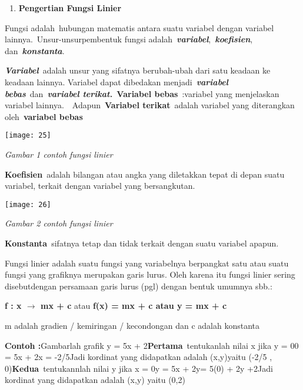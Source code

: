 \documentclass[11pt,fleqn]{book} %
\begin{document}
\begin{myEnumerate}
\begin{itemize}
\begin{enumerate}
\item \textbf{ Pengertian Fungsi Linier}
\end{enumerate}

\noindent \textbf{}

Fungsi adalah~hubungan matematis antara suatu variabel dengan variabel lainnya.~Unsur-unsurpembentuk fungsi adalah~\textbf{\textit{variabel}},~\textbf{\textit{koefisien}}, dan~\textbf{\textit{konstanta}}.

\textbf{\textit{Variabel}}~adalah unsur yang sifatnya berubah-ubah dari satu keadaan ke keadaan lainnya. Variabel dapat dibedakan menjadi~\textbf{\textit{variabel bebas}}~dan~\textbf{\textit{variabel terikat.}}~\textbf{Variabel bebas}~:variabel yang menjelaskan variabel lainnya.~~Adapun~\textbf{Variabel terikat}~adalah variabel yang diterangkan oleh~\textbf{variabel bebas}

\begin{center}
\texttt{[image: 25]}
\end{center}

\textit{Gambar 1 contoh fungsi linier}

\textbf{Koefisien}~adalah bilangan atau angka yang diletakkan tepat di depan suatu variabel, terkait dengan variabel yang bersangkutan.

\begin{center}
\texttt{[image: 26]}
\end{center}

\textit{Gambar 2 contoh fungsi linier}



\textbf{Konstanta}~sifatnya tetap dan tidak terkait dengan suatu variabel apapun.



Fungsi linier adalah suatu fungsi yang variabelnya berpangkat satu atau suatu fungsi yang grafiknya merupakan garis lurus. Oleh karena itu fungsi linier sering disebutdengan persamaan garis lurus (pgl) dengan bentuk umumnya sbb.:

\textbf{f : x $\boldsymbol{\mathrm{\to}}$ mx + c} atau \textbf{f(x) = mx + c atau y = mx + c}

m adalah gradien / kemiringan / kecondongan dan c adalah konstanta



\noindent \textbf{Contoh :}Gambarlah grafik y = 5x + 2\textbf{Pertama}~tentukanlah nilai x jika y = 00 = 5x + 2x = -2/5Jadi kordinat yang didapatkan adalah (x,y)yaitu (-2/5 , 0)\textbf{Kedua}~tentukannlah nilai y jika x = 0y = 5x + 2y= 5(0) + 2y +2Jadi kordinat yang didapatkan adalah (x,y) yaitu (0,2)


\end{itemize}
\end{myEnumerate}
\end{document}
